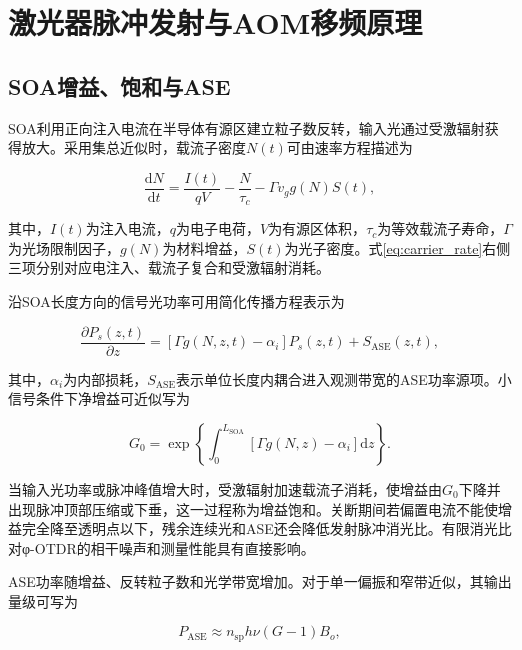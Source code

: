 \section{激光器脉冲发射与AOM移频原理}

\subsection{SOA增益、饱和与ASE}

SOA利用正向注入电流在半导体有源区建立粒子数反转，输入光通过受激辐射获得放大。采用集总近似时，载流子密度$N(t)$可由速率方程描述为

\begin{equation}
\frac{\mathrm dN}{\mathrm dt}
=
\frac{I(t)}{qV}
-\frac{N}{\tau_c}
-\Gamma v_g g(N)S(t),
\label{eq:carrier_rate}
\end{equation}

其中，$I(t)$为注入电流，$q$为电子电荷，$V$为有源区体积，$\tau_c$为等效载流子寿命，$\Gamma$为光场限制因子，$g(N)$为材料增益，$S(t)$为光子密度。式\eqref{eq:carrier_rate}右侧三项分别对应电注入、载流子复合和受激辐射消耗\cite{talli2003gain,yang2021carrier,sobhanan2022soa}。

沿SOA长度方向的信号光功率可用简化传播方程表示为

\begin{equation}
\frac{\partial P_s(z,t)}{\partial z}
=
\left[\Gamma g\!\left(N,z,t\right)-\alpha_i\right]P_s(z,t)
+S_{\mathrm{ASE}}(z,t),
\label{eq:soa_power}
\end{equation}

其中，$\alpha_i$为内部损耗，$S_{\mathrm{ASE}}$表示单位长度内耦合进入观测带宽的ASE功率源项。小信号条件下净增益可近似写为

\begin{equation}
G_0
=
\exp\left\{
\int_0^{L_{\mathrm{SOA}}}
\left[\Gamma g(N,z)-\alpha_i\right]\mathrm dz
\right\}.
\label{eq:soa_gain}
\end{equation}

当输入光功率或脉冲峰值增大时，受激辐射加速载流子消耗，使增益由$G_0$下降并出现脉冲顶部压缩或下垂，这一过程称为增益饱和\cite{mecozzi1997saturation,sobhanan2022soa,connelly2023dynamic}。关断期间若偏置电流不能使增益完全降至透明点以下，残余连续光和ASE还会降低发射脉冲消光比。有限消光比对φ-OTDR的相干噪声和测量性能具有直接影响\cite{ren2016extinction}。

ASE功率随增益、反转粒子数和光学带宽增加。对于单一偏振和窄带近似，其输出量级可写为

\begin{equation}
P_{\mathrm{ASE}}
\approx
n_{\mathrm{sp}}h\nu(G-1)B_o,
\label{eq:ase}
\end{equation}

